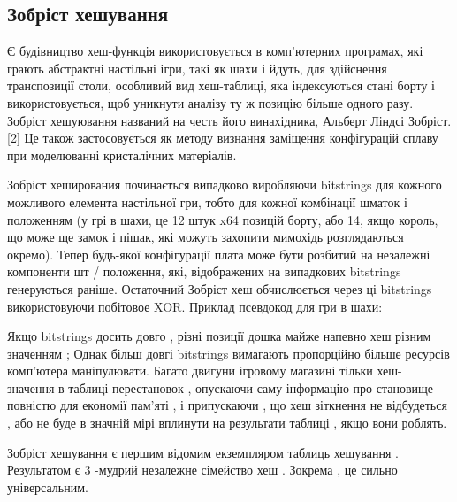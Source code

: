 \subsection{Зобріст хешування}
Є будівництво хеш-функція використовується в комп'ютерних програмах, які грають абстрактні настільні ігри, такі як шахи і йдуть, для здійснення транспозиції столи, особливий вид хеш-таблиці, яка індексуються стані борту і використовується, щоб уникнути аналізу ту ж позицію більше одного разу. Зобріст хешуювання названий на честь його винахідника, Альберт Ліндсі Зобріст. [2] Це також застосовується як методу визнання заміщення конфігурацій сплаву при моделюванні кристалічних матеріалів.

Зобріст хеширования починається випадково виробляючи bitstrings для кожного можливого елемента настільної гри, тобто для кожної комбінації шматок і положенням (у грі в шахи, це 12 штук x64 позицій борту, або 14, якщо король, що може ще замок і пішак, які можуть захопити мимохідь розглядаються окремо). Тепер будь-якої конфігурації плата може бути розбитий на незалежні компоненти шт / положення, які, відображених на випадкових bitstrings генеруються раніше. Остаточний Зобріст хеш обчислюється через ці bitstrings використовуючи побітовое XOR. Приклад псевдокод для гри в шахи:



Якщо bitstrings досить довго , різні позиції дошка майже напевно хеш різним значенням ; Однак більш довгі bitstrings вимагають пропорційно більше ресурсів комп'ютера маніпулювати. Багато двигуни ігровому магазині тільки хеш- значення в таблиці перестановок , опускаючи саму інформацію про становище повністю для економії пам'яті , і припускаючи , що хеш зіткнення не відбудеться , або не буде в значній мірі вплинути на результати таблиці , якщо вони роблять.

Зобріст хешування є першим відомим екземпляром таблиць хешування . Результатом є 3 -мудрий незалежне сімейство хеш . Зокрема , це сильно універсальним.

